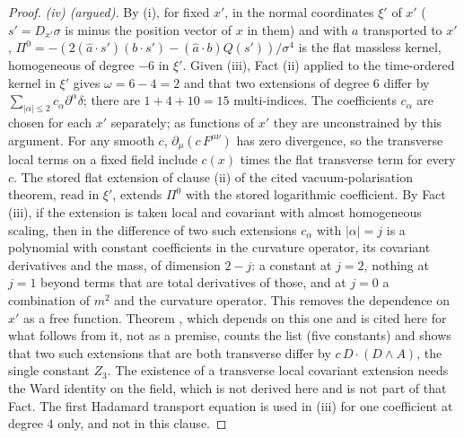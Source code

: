 \begin{proof}
\emph{(iv) (argued).} By (i), for fixed $x'$, in the normal coordinates $\xi'$ of $x'$ ($s' = D_{x'}\sigma$ is minus the position vector of $x$ in them) and with $a$ transported to $x'$, $\Pi^{0} = -(2(\hat a\cdot s')(b\cdot s') - (\hat a\cdot b)Q(s'))/\sigma^{4}$ is the flat massless kernel, homogeneous of degree $-6$ in $\xi'$. Given (iii), Fact (ii) applied to the time-ordered kernel in $\xi'$ gives $\omega = 6 - 4 = 2$ and that two extensions of degree $6$ differ by $\sum_{|\alpha| \le 2}c_{\alpha}\partial^{\alpha}\delta$; there are $1 + 4 + 10 = 15$ multi-indices. The coefficients $c_{\alpha}$ are chosen for each $x'$ separately; as functions of $x'$ they are unconstrained by this argument. For any smooth $c$, $\partial_{\mu}(c\,F^{\mu\nu})$ has zero divergence, so the transverse local terms on a fixed field include $c(x)$ times the flat transverse term for every $c$. The stored flat extension of clause (ii) of the cited vacuum-polarisation theorem, read in $\xi'$, extends $\Pi^{0}$ with the stored logarithmic coefficient. By Fact (iii), if the extension is taken local and covariant with almost homogeneous scaling, then in the difference of two such extensions $c_{\alpha}$ with $|\alpha| = j$ is a polynomial with constant coefficients in the curvature operator, its covariant derivatives and the mass, of dimension $2 - j$: a constant at $j = 2$, nothing at $j = 1$ beyond terms that are total derivatives of those, and at $j = 0$ a combination of $m^{2}$ and the curvature operator. This removes the dependence on $x'$ as a free function. Theorem , which depends on this one and is cited here for what follows from it, not as a premise, counts the list (five constants) and shows that two such extensions that are both transverse differ by $c\,D\cdot(D\wedge A)$, the single constant $Z_{3}$. The existence of a transverse local covariant extension needs the Ward identity on the field, which is not derived here and is not part of that Fact. The first Hadamard transport equation is used in (iii) for one coefficient at degree $4$ only, and not in this clause.
\end{proof}
